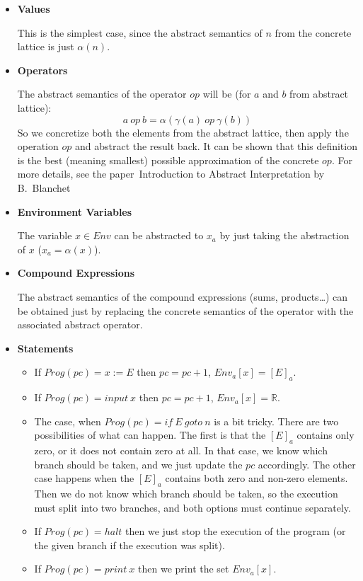 \begin{itemize}
    \item \textbf{Values}

    This is the simplest case, since the abstract semantics of $n$ from the concrete lattice is just $\alpha(n)$.

    \item \textbf{Operators}

    The abstract semantics of the operator $op$ will be (for $a$ and $b$ from abstract lattice):
    \[a \: op \: b = \alpha(\gamma(a) \: op \: \gamma(b))\]
    So we concretize both the elements from the abstract lattice, then apply the operation $op$ and abstract the result
    back.
    It can be shown that this definition is the best (meaning smallest) possible approximation of the concrete $op$.
    For more details, see the paper~Introduction to Abstract Interpretation by B.~Blanchet\cite{Blanchet:2002:AI}


    \item \textbf{Environment Variables}

    The variable $x \in Env$ can be abstracted to $x_a$ by just taking the abstraction of $x$ ($x_a = \alpha(x)$).

    \item \textbf{Compound Expressions}

    The abstract semantics of the compound expressions (sums, products\ldots) can be obtained just by replacing the
    concrete semantics of the operator with the associated abstract operator.

    \item \textbf{Statements}

    \begin{itemize}
        \item
        If $Prog(pc) = x := E$ then
        $pc = pc + 1$, $Env_a[x] = [E]_a$.

        \item
        If $Prog(pc) = input \: x$ then
        $pc = pc + 1$, $Env_a[x] = \mathbb{R}$.

        \item
        The case, when $Prog(pc) = if \: E \: goto \: n$ is a bit tricky.
        There are two possibilities of what can happen.
        The first is that the $[E]_a$ contains only zero, or it does not contain zero at all.
        In that case, we know which branch should be taken, and we just update the $pc$ accordingly.
        The other case happens when the $[E]_a$ contains both zero and non-zero elements.
        Then we do not know which branch should be taken, so the execution must split into two branches, and both options
        must continue separately.

        \item
        If $Prog(pc) = halt$ then we just stop the execution of the program (or the given branch if the execution was
        split).

        \item
        If $Prog(pc) = print \: x$ then we print the set $Env_a[x].$
    \end{itemize}
\end{itemize}

